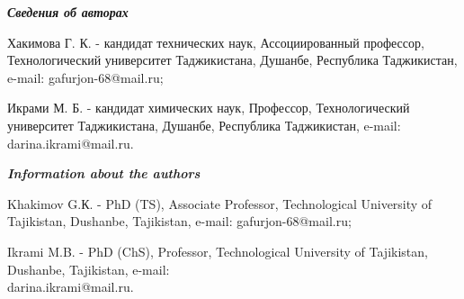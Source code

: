 \begin{authorinfo}
\hspace{1em}\emph{{\bfseries Сведения об авторах}}

Хакимова Г. К. - кандидат технических наук, Ассоциированный профессор,
Технологический университет Таджикистана, Душанбе, Республика
Таджикистан, e-mail: gafurjon-68@mail.ru;

Икрами М. Б. - кандидат химических наук, Профессор, Технологический
университет Таджикистана, Душанбе, Республика Таджикистан, e-mail:
darina.ikrami@mail.ru.

\hspace{1em}\emph{{\bfseries Information about the authors}}

Khakimov G.К. - PhD (TS), Associate Professor, Technological University
of Tajikistan, Dushanbe, Tajikistan, e-mail: gafurjon-68@mail.ru;

Ikrami M.B. - PhD (ChS), Professor, Technological University of
Tajikistan, Dushanbe, Tajikistan, e-mail: \\darina.ikrami@mail.ru.
\end{authorinfo}
